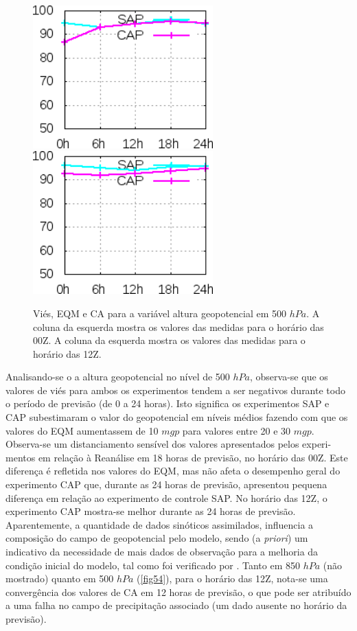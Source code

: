 \begin{figure}[!hbp]
\includegraphics[height=5.5cm]{./figs/CA500zgeo0Z.png}\includegraphics[height=5.5cm]{./figs/CA500zgeo12Z.png}
\caption{Viés, EQM e CA para a variável altura geopotencial em 500 $hPa$. A coluna da esquerda mostra os valores das medidas para o horário das 00Z. A coluna da esquerda mostra os valores das medidas para o horário das 12Z.}
\label{fig54}
\end{figure}

\break

Analisando-se o a altura geopotencial no nível de 500 $hPa$, observa-se que os valores de viés para ambos os experimentos tendem a ser negativos durante todo o período de previsão (de 0 a 24 horas). Isto significa os experimentos SAP e CAP subestimaram o valor do geopotencial em níveis médios fazendo com que os valores do EQM aumentassem de 10 $mgp$ para valores entre 20 e 30 $mgp$. Observa-se um distanciamento sensível dos valores apresentados pelos experi-mentos em relação à Reanálise em 18 horas de previsão, no horário das 00Z. Este diferença é refletida nos valores do EQM, mas não afeta o desempenho geral do experimento CAP que, durante as 24 horas de previsão, apresentou pequena diferença em relação ao experimento de controle SAP. No horário das 12Z, o experimento CAP mostra-se melhor durante as 24 horas de previsão. Aparentemente, a quantidade de dados sinóticos assimilados, influencia a composição do campo de geopotencial pelo modelo, sendo (a \textit{priori}) um indicativo da necessidade de mais dados de observação para a melhoria da condição inicial do modelo, tal como foi verificado por . Tanto em 850 $hPa$ (não mostrado) quanto em 500 $hPa$ (\autoref{fig54}), para o horário das 12Z, nota-se uma convergência dos valores de CA em 12 horas de previsão, o que pode ser atribuído a uma falha no campo de precipitação associado (um dado ausente no horário da previsão).

